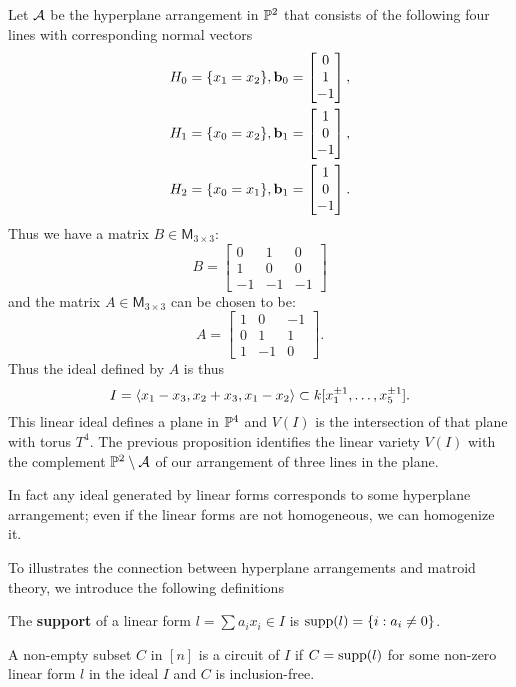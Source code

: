 	\begin{example}
		Let $\cala$ be the hyperplane arrangement in $\P^2$
		that consists of the following four lines 
		with corresponding normal vectors
		\begin{align*}
			H_0 &= \{x_1 = x_2\}, \mathbf{b}_0 = \threevector{0}{1}{-1}, \\
			H_1 &= \{x_0 = x_2 \}, \mathbf{b}_1 = \threevector{1}{0}{-1},\\
			H_2 &= \{x_0 = x_1 \}, \mathbf{b}_1 = \threevector{1}{0}{-1}.
 		\end{align*}
		Thus we have a matrix $B \in \mathsf{M}_{3 \times 3}$:
		\[
		B = 
		\begin{bmatrix}
			0 &  1 & 0 \\
			1 & 0 & 0 \\
			-1 & -1 & -1 
		\end{bmatrix}
		\]
		and the matrix $A \in \mathsf{M}_{3 \times 3}$ 
		can be chosen to be:
		\[
		A = 
		\begin{bmatrix}
			1 &  0 & -1 \\
			0 & 1 & 1 \\
			1 & -1 & 0 
		\end{bmatrix}.
		\]
		Thus the ideal defined by $A$ is thus 
		\[
		I = \inner{x_1 - x_3, x_2 + x_3, x_1 - x_2} \subset k[x_1^{\pm 1}, \ldots, x_5^{\pm 1}].
		\]
		This linear ideal defines a plane in $\P^4$ 
		and $V(I)$ is the intersection of that plane with torus $T^4$.
		The previous proposition identifies the linear variety $V(I)$ 
		with the complement $\P^2\setminus \cala$ 
		of our arrangement of three lines in the plane. 
	\end{example}
	
	In fact any ideal generated by linear forms 
	corresponds to some hyperplane arrangement;
	even if the linear forms are not homogeneous, 
	we can homogenize it. 
	
	To illustrates the connection between hyperplane arrangements
	and matroid theory,
	we introduce the following definitions
	\begin{definition}[Support]
		The \textbf{support} of a linear form 
		$l = \sum a_i x_i \in I$ is 
		$\supp(l) = \{i : a_i \ne 0\}$.
	\end{definition}
	
	\begin{definition}[Circuit]
	\label{def:circuit}
		A non-empty subset $C$ in $[n]$ is a circuit of $I$ 
		if $C = \supp(l)$ for some non-zero linear form $l$ 
		in the ideal $I$
		and $C$ is inclusion-free.
	\end{definition}
	
